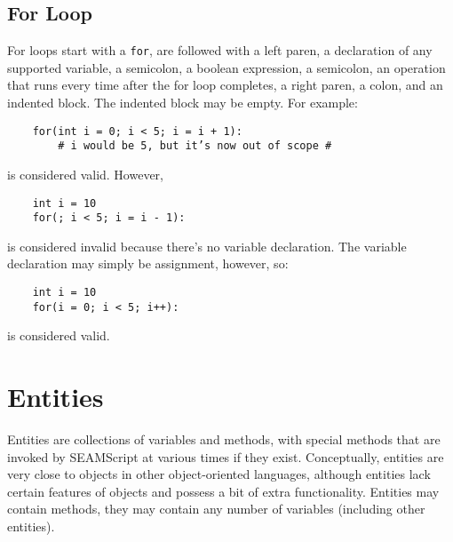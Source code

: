 \documentclass[titlepage]{article}
\begin{document}
\subsection{For Loop}
For loops start with a \verb|for|, are followed with a left paren, a declaration of any supported variable, a semicolon, a boolean expression, a semicolon, an operation that runs every time after the for loop completes, a right paren, a colon, and an indented block. The indented block may be empty. For example:
\begin{verbatim}
    for(int i = 0; i < 5; i = i + 1):
        # i would be 5, but it’s now out of scope #
\end{verbatim}
is considered valid. However,
\begin{verbatim}
    int i = 10
    for(; i < 5; i = i - 1):
\end{verbatim}
is considered invalid because there’s no variable declaration. The variable declaration may simply be assignment, however, so:
\begin{verbatim}
    int i = 10
    for(i = 0; i < 5; i++):
\end{verbatim}
is considered valid.

\section{Entities}
\label{sec:ent}
Entities are collections of variables and methods, with special methods that are invoked by SEAMScript at various times if they exist. Conceptually, entities are very close to objects in other object-oriented languages, although entities lack certain features of objects and possess a bit of extra functionality. Entities may contain methods, they may contain any number of variables (including other entities). 
\end{document}
